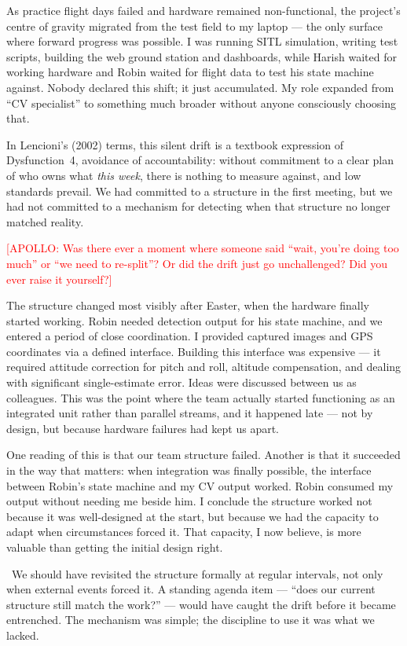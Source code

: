 As practice flight days failed and hardware remained non-functional, the project's centre of gravity migrated from the test field to my laptop --- the only surface where forward progress was possible. I was running SITL simulation, writing test scripts, building the web ground station and dashboards, while Harish waited for working hardware and Robin waited for flight data to test his state machine against. Nobody declared this shift; it just accumulated. My role expanded from ``CV specialist'' to something much broader without anyone consciously choosing that.

In Lencioni's (2002) terms, this silent drift is a textbook expression of Dysfunction~4, avoidance of accountability: without commitment to a clear plan of who owns what \textit{this week}, there is nothing to measure against, and low standards prevail. We had committed to a structure in the first meeting, but we had not committed to a mechanism for detecting when that structure no longer matched reality.

\textcolor{red}{[APOLLO: Was there ever a moment where someone said ``wait, you're doing too much'' or ``we need to re-split''? Or did the drift just go unchallenged? Did you ever raise it yourself?]}

The structure changed most visibly after Easter, when the hardware finally started working. Robin needed detection output for his state machine, and we entered a period of close coordination. I provided captured images and GPS coordinates via a defined interface. Building this interface was expensive --- it required attitude correction for pitch and roll, altitude compensation, and dealing with significant single-estimate error. Ideas were discussed between us as colleagues. This was the point where the team actually started functioning as an integrated unit rather than parallel streams, and it happened late --- not by design, but because hardware failures had kept us apart.

One reading of this is that our team structure failed. Another is that it succeeded in the way that matters: when integration was finally possible, the interface between Robin's state machine and my CV output worked. Robin consumed my output without needing me beside him. I conclude the structure worked not because it was well-designed at the start, but because we had the capacity to adapt when circumstances forced it. That capacity, I now believe, is more valuable than getting the initial design right.

\ebi\ We should have revisited the structure formally at regular intervals, not only when external events forced it. A standing agenda item --- ``does our current structure still match the work?'' --- would have caught the drift before it became entrenched. The mechanism was simple; the discipline to use it was what we lacked.

